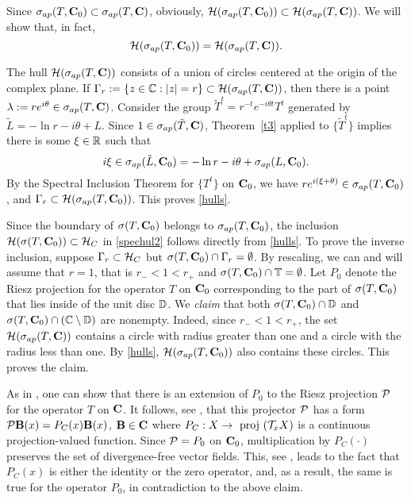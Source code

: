 \begin{pf} Since  $\sigma_{ap}(T,{{\bold C}_0})\subset \sigma_{ap}(T,{\bold C})$,
 obviously, ${\cal{H}}(\sigma_{ap}(T,{{\bold C}_0}))
\subset {\cal{H}}(\sigma_{ap}(T, {\bold C}))$. We will show that, in fact,
\begin{equation}\lb{hulls}
\calH(\sig_{ap}(T,\cnd))
= \calH(\sig_{ap}(T, \bC)).
\end{equation}

The hull ${\cal{H}}(\sigma_{ap}(T, {\bold C}))$ consists of a union of circles
centered at the origin of the complex plane. If
$\Gamma_r:=\{z\in{\Bbb{C}}:|z|=r\}\subset {\cal{H}}(\sigma_{ap}(T, {\bold C}))$, then 
there is a point $\lambda:=re^{i\theta}\in \sigma_{ap}(T, {\bold C})$. 
Consider the group $\tilde{T}^t=r^{-t}e^{-i\theta t}T^t$ generated by
$\tilde{L}=-\ln r-i\theta+L$. 
Since $1\in\sigma_{ap}(\tilde{T}, {\bold C})$,
Theorem~\ref{t3} applied to $\{\tilde{T}^t\}$ implies there is
some $\xi\in{\Bbb{R}}$ such that 
\[
i\xi\in\sigma_{ap}(\tilde{L}, {{\bold C}_0})=
                             -\ln r-i\theta+\sigma_{ap}(L, {{\bold C}_0}).
\] 
By the Spectral Inclusion Theorem for $\{T^t\}$ on ${{\bold C}_0}$,
we have $re^{i(\xi+\theta)}\in\sigma_{ap}(T,{{\bold C}_0})$, and
$\Gamma_r\subset {\cal{H}}(\sigma_{ap}(T,{{\bold C}_0}))$. This proves
\eqref{hulls}.

Since the boundary of $\sigma(T, {{\bold C}_0})$ belongs to
$\sigma_{ap}(T, {{\bold C}_0})$, the inclusion
${\cal{H}}(\sigma(T, {{\bold C}_0}))\subset{\cal{H}}_C$ in \eqref{spechul2}
follows directly from \eqref{hulls}. To prove the inverse inclusion,
suppose $\Gamma_r\subset{\cal{H}}_C$ but
$\sigma(T, {{\bold C}_0})\cap\Gamma_r=\emptyset$.
By rescaling, we can and will assume that $r=1$, that is $r_-<1<r_+$ and 
$\sigma(T, {{\bold C}_0})\cap{\Bbb{T}}=\emptyset$. Let $P_0$
denote the Riesz projection for the operator $T$ on ${{\bold C}_0}$
corresponding to the part of $\sigma(T,{{\bold C}_0})$ 
that lies inside of the unit disc ${\Bbb{D}}$. We {\it claim}
that both $\sigma(T,{{\bold C}_0})\cap{\Bbb{D}}$ and $\sigma(T,{{\bold C}_0})\cap({\Bbb{C}}\setminus{\Bbb{D}})$
are nonempty. Indeed, since $r_-<1<r_+$,
the set ${\cal{H}}(\sigma_{ap}(T, {\bold C}))$ contains a circle
with radius greater than one and a circle
with the radius less than one. By \eqref{hulls}, 
${\cal{H}}(\sigma_{ap}(T,{{\bold C}_0}))$ also contains these circles. 
This proves the claim.

As in \cite[Theorem~3.4]{clms},
one can show that  there is an extension of $P_0$ 
to the Riesz projection ${\cal P}$ 
for the operator $T$ on ${\bold C}$. It follows, 
see \cite{CS,LS,Mather}, that this projector $\cal P$ has a form
${\cal P}{\bold B}(x)=P_C(x){\bold B}(x)$, ${\bold B}\in{\bold C}$
where $P_C: X\to \mbox{ proj }({\cal{T}}_xX)$
is a continuous projection-valued function. Since ${\cal P}=P_0$
on ${{\bold C}_0}$, multiplication by $P_C(\cdot)$ preserves
the set of divergence-free vector fields. 
This, see \cite[Theorem~3.4]{clms},
leads to the fact that $P_C(x)$ is either the identity or the zero
operator, and, as a result, the same is true for the operator $P_0$,
in contradiction to the above claim.


\end{pf}
